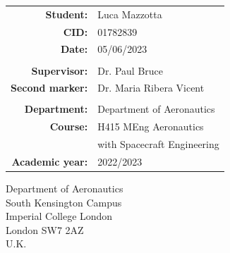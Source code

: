 \begin{titlepage}
\vspace{0.5cm}
\begin{tabular}{rl}
\centering
{\bf Student:} & Luca Mazzotta
\\
{\bf CID:} & 01782839
\\
{\bf    Date:} & {05/06/2023}
\\
\\
{\bf Supervisor:} & Dr. Paul Bruce
\\
{\bf Second marker:} & Dr. Maria Ribera Vicent
\\
\\
{\bf Department:} & {Department of Aeronautics}  
\\
{\bf    Course:} & {H415 MEng Aeronautics}
\\
{} & {with Spacecraft Engineering}  


\\
{\bf    Academic year:} & {2022/2023}     


  
\end{tabular}

\begin{center}

{Department of Aeronautics\\
South Kensington Campus\\
Imperial College London\\
London SW7 2AZ\\
U.K.\\}
\end{center}

\vspace{0.5cm}

\vfill %

\end{titlepage}  